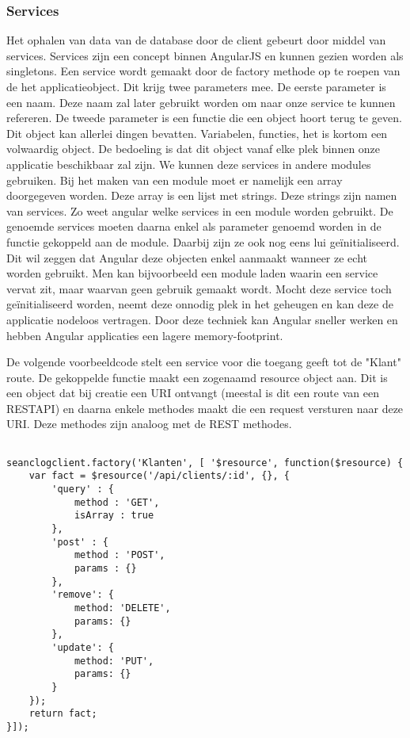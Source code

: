 \documentclass[a4paper,11pt]{article}
\begin{document}
\subsubsection{Services}
Het ophalen van data van de database door de client gebeurt door middel van services. Services zijn een concept binnen AngularJS en kunnen gezien worden als singletons. Een service wordt gemaakt door de factory methode op te roepen van de het applicatieobject. Dit krijg twee parameters mee. De eerste parameter is een naam. Deze naam zal later gebruikt worden om naar onze service te kunnen refereren. De tweede parameter is een functie die een object hoort terug te geven. Dit object kan allerlei dingen bevatten. Variabelen, functies, het is kortom een volwaardig object. De bedoeling is dat dit object vanaf elke plek binnen onze applicatie beschikbaar zal zijn. We kunnen deze services in andere modules gebruiken. Bij het maken van een module moet er namelijk een array doorgegeven worden. Deze array is een lijst met strings. Deze strings zijn namen van services. Zo weet angular welke services in een module worden gebruikt. De genoemde services moeten daarna enkel als parameter genoemd worden in de functie gekoppeld aan de module. Daarbij zijn ze ook nog eens lui geïnitialiseerd. Dit wil zeggen dat Angular deze objecten enkel aanmaakt wanneer ze echt worden gebruikt. Men kan bijvoorbeeld een module laden waarin een service vervat zit, maar waarvan geen gebruik gemaakt wordt. Mocht deze service toch geïnitialiseerd worden, neemt deze onnodig plek in het geheugen en kan deze de applicatie nodeloos vertragen. Door deze techniek kan Angular sneller werken en hebben Angular applicaties een lagere memory-footprint.

De volgende voorbeeldcode stelt een service voor die toegang geeft tot de "Klant" route. De gekoppelde functie maakt een zogenaamd resource object aan. Dit is een object dat bij creatie een URI ontvangt (meestal is dit een route van een RESTAPI) en daarna enkele methodes maakt die een request versturen naar deze URI. Deze methodes zijn analoog met de REST methodes.
\begin{lstlisting}

seanclogclient.factory('Klanten', [ '$resource', function($resource) {
	var fact = $resource('/api/clients/:id', {}, {
		'query' : {
			method : 'GET',
			isArray : true
		},
		'post' : {
			method : 'POST',
			params : {}
		},
		'remove': {
			method: 'DELETE',
			params: {}
		},
		'update': {
			method: 'PUT',
			params: {}
		}
	});
	return fact;
}]);

\end{lstlisting}
\end{document}
